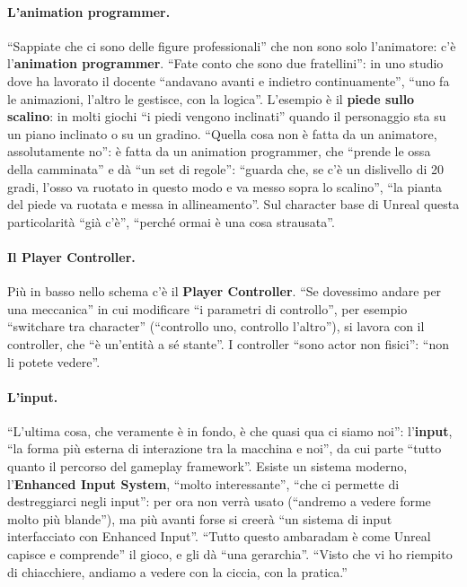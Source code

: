 \paragraph{L'animation programmer.} ``Sappiate che ci sono delle figure professionali''
che non sono solo l'animatore: c'è l'\textbf{animation programmer}. ``Fate conto che sono
due fratellini'': in uno studio dove ha lavorato il docente ``andavano avanti e indietro
continuamente'', ``uno fa le animazioni, l'altro le gestisce, con la logica''. L'esempio
è il \textbf{piede sullo scalino}: in molti giochi ``i piedi vengono inclinati'' quando il
personaggio sta su un piano inclinato o su un gradino. ``Quella cosa non è fatta da un
animatore, assolutamente no'': è fatta da un animation programmer, che ``prende le ossa
della camminata'' e dà ``un set di regole'': ``guarda che, se c'è un dislivello di 20
gradi, l'osso va ruotato in questo modo e va messo sopra lo scalino'', ``la pianta del
piede va ruotata e messa in allineamento''. Sul character base di Unreal questa
particolarità ``già c'è'', ``perché ormai è una cosa strausata''.

\paragraph{Il Player Controller.} Più in basso nello schema c'è il \textbf{Player
Controller}. ``Se dovessimo andare per una meccanica'' in cui modificare ``i parametri di
controllo'', per esempio ``switchare tra character'' (``controllo uno, controllo
l'altro''), si lavora con il controller, che ``è un'entità a sé stante''. I controller
``sono actor non fisici'': ``non li potete vedere''.

\paragraph{L'input.} ``L'ultima cosa, che veramente è in fondo, è che quasi qua ci siamo
noi'': l'\textbf{input}, ``la forma più esterna di interazione tra la macchina e noi'', da
cui parte ``tutto quanto il percorso del gameplay framework''. Esiste un sistema
moderno, l'\textbf{Enhanced Input System}, ``molto interessante'', ``che ci permette di
destreggiarci negli input'': per ora non verrà usato (``andremo a vedere forme molto più
blande''), ma più avanti forse si creerà ``un sistema di input interfacciato con Enhanced
Input''. ``Tutto questo ambaradam è come Unreal capisce e comprende'' il gioco, e gli dà
``una gerarchia''. ``Visto che vi ho riempito di chiacchiere, andiamo a vedere con la
ciccia, con la pratica.''


